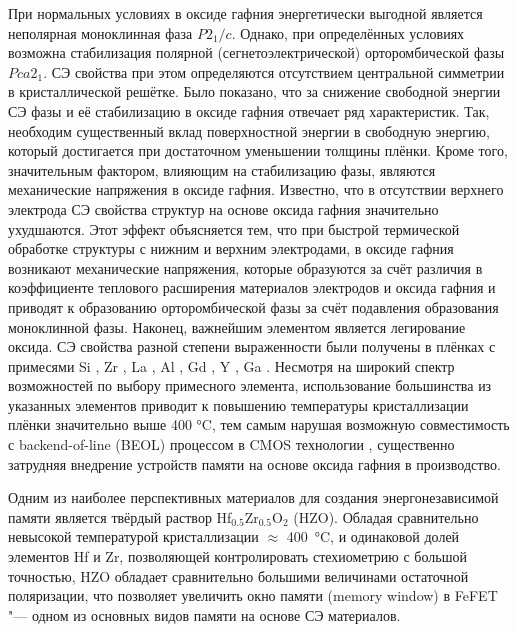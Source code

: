 При нормальных условиях в оксиде гафния энергетически выгодной является неполярная моноклинная фаза \(P2_1/c\). %
Однако, при определённых условиях возможна стабилизация полярной (сегнетоэлектрической) орторомбической фазы \(Pca2_1\). СЭ свойства при этом определяются отсутствием центральной симметрии в кристаллической решётке.
Было показано, что за снижение свободной энергии СЭ фазы и её стабилизацию в оксиде гафния отвечает ряд характеристик. Так, необходим существенный вклад поверхностной энергии в свободную энергию, который достигается при достаточном уменьшении толщины плёнки. Кроме того, значительным фактором, влияющим на стабилизацию фазы, являются механические напряжения в оксиде гафния. Известно, что в отсутствии верхнего электрода СЭ свойства структур на основе оксида гафния значительно ухудшаются. Этот эффект объясняется тем, что при быстрой термической обработке структуры с нижним и верхним электродами, в оксиде гафния возникают механические напряжения, которые образуются за счёт различия в коэффициенте теплового расширения материалов электродов и оксида гафния и приводят к образованию орторомбической фазы за счёт подавления образования моноклинной фазы. Наконец, важнейшим элементом является легирование оксида. СЭ свойства разной степени выраженности были получены в плёнках с примесями Si \cite{bosckeFerroelectricityHafniumOxide2011}, Zr \cite{bosckePhaseTransitionsFerroelectric2011}, La \cite{schroederLanthanumDopedHafniumOxide2018}, Al \cite{muellerIncipientFerroelectricityDoped2012}, Gd \cite{muellerFerroelectricityGdDopedHfO2012}, Y \cite{mullerFerroelectricityYttriumdopedHafnium2011}, Ga \cite{chouprikNanoscaleTailoringFerroelectricity2020}. Несмотря на широкий спектр возможностей по выбору примесного элемента, использование большинства из указанных элементов приводит к повышению температуры кристаллизации плёнки значительно выше 400 \si{\degreeCelsius}, тем самым нарушая возможную совместимость с backend-of-line (BEOL) процессом в CMOS технологии \cite{schmitzLowTemperatureThin2018}, существенно затрудняя внедрение устройств памяти на основе оксида гафния в производство.

Одним из наиболее перспективных материалов для создания энергонезависимой памяти является твёрдый раствор Hf\(_{0.5}\)Zr\(_{0.5}\)O\(_2\) (HZO). Обладая сравнительно невысокой температурой кристаллизации \(\approx\) \SI{400}{\degreeCelsius}, и одинаковой долей элементов Hf и Zr, позволяющей контролировать стехиометрию с большой точностью, HZO обладает сравнительно большими величинами остаточной поляризации, что позволяет увеличить окно памяти (memory window) \cite{mullerNanosecondPolarizationSwitching2012} в FeFET "--- одном из основных видов памяти на основе СЭ материалов.

